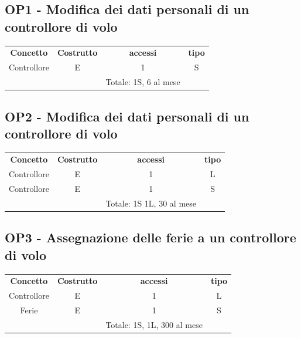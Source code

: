 \subsection*{OP1 - Modifica dei dati personali di un controllore di volo}
\begin{table}[H]
  \centering
  \begin{tabular}{cccc}

  \rowcolor{tableheadercolor}
  \textbf{Concetto} & \textbf{Costrutto} & \textbf{accessi} & \textbf{tipo}\\

  Controllore & E & 1 & S \\
  &  & Totale: 1S, 6 al mese &\\

  \end{tabular}
  \end{table}

    \subsection*{OP2 - Modifica dei dati personali di un controllore di volo}
    \begin{table}[H]
      \centering
      \begin{tabular}{cccc}
    
      \rowcolor{tableheadercolor}
      \textbf{Concetto} & \textbf{Costrutto} & \textbf{accessi} & \textbf{tipo}\\
    
      Controllore & E & 1 & L \\
      Controllore & E & 1 & S \\
      &  & Totale: 1S 1L, 30 al mese &\\
    
      \end{tabular}
      \end{table}
  
      \subsection*{OP3 - Assegnazione delle ferie a un controllore di volo}
      \begin{table}[H]
    \centering
    \begin{tabular}{cccc}
  
    \rowcolor{tableheadercolor}
    \textbf{Concetto} & \textbf{Costrutto} & \textbf{accessi} & \textbf{tipo}\\
  
    Controllore & E & 1 & L \\
    Ferie & E & 1 & S \\
    & & Totale: 1S, 1L, 300 al mese &\\
  
    \end{tabular}
    \end{table}

